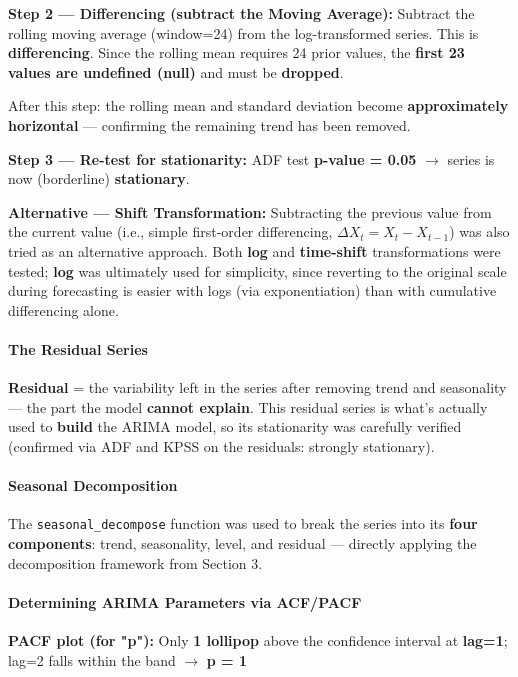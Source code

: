 \documentclass[12pt,openany]{book}
\begin{document}
\textbf{Step 2 --- Differencing (subtract the Moving Average):}
Subtract the rolling moving average (window=24) from the log-transformed series. This is \textbf{differencing}. Since the rolling mean requires 24 prior values, the \textbf{first 23 values are undefined (null)} and must be \textbf{dropped}.

After this step: the rolling mean and standard deviation become \textbf{approximately horizontal} --- confirming the remaining trend has been removed.

\textbf{Step 3 --- Re-test for stationarity:}
ADF test \textbf{p-value = 0.05} \(\rightarrow\) series is now (borderline) \textbf{stationary}.

\textbf{Alternative --- Shift Transformation:}
Subtracting the previous value from the current value (i.e., simple first-order differencing, \(\Delta X_t = X_t - X_{t-1}\)) was also tried as an alternative approach. Both \textbf{log} and \textbf{time-shift} transformations were tested; \textbf{log} was ultimately used for simplicity, since reverting to the original scale during forecasting is easier with logs (via exponentiation) than with cumulative differencing alone.

\paragraph{The Residual Series}

\textbf{Residual} = the variability left in the series after removing trend and seasonality --- the part the model \textbf{cannot explain}. This residual series is what's actually used to \textbf{build} the ARIMA model, so its stationarity was carefully verified (confirmed via ADF and KPSS on the residuals: strongly stationary).

\paragraph{Seasonal Decomposition}

The \texttt{seasonal\_decompose} function was used to break the series into its \textbf{four components}: trend, seasonality, level, and residual --- directly applying the decomposition framework from Section 3.

\paragraph{Determining ARIMA Parameters via ACF/PACF}

\textbf{PACF plot (for "p"):}
Only \textbf{1 lollipop} above the confidence interval at \textbf{lag=1}; lag=2 falls within the band \(\rightarrow\) \textbf{p = 1}
\end{document}
